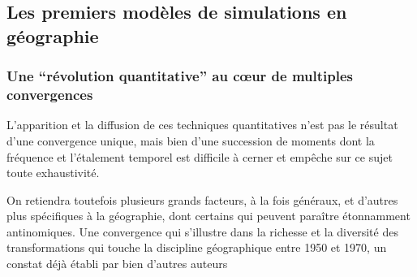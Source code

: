 



\subsection{Les premiers modèles de simulations en géographie}
\label{sec:premier_modele_geo}

\subsubsection{Une \enquote{révolution quantitative} au cœur de multiples convergences}
\label{ssec:revol_quanti}

L'apparition et la diffusion de ces techniques quantitatives n'est pas le résultat d'une convergence unique, mais bien d'une succession de moments dont la fréquence et l'étalement temporel est difficile à cerner et empêche sur ce sujet toute exhaustivité. 

On retiendra toutefois plusieurs grands facteurs, à la fois généraux, et d'autres plus spécifiques à la géographie, dont certains qui peuvent paraître étonnamment antinomiques. Une convergence qui s'illustre dans la richesse et la diversité des transformations qui touche la discipline géographique entre 1950 et 1970, un constat déjà établi par bien d'autres auteurs \autocite{Varenne2014}

